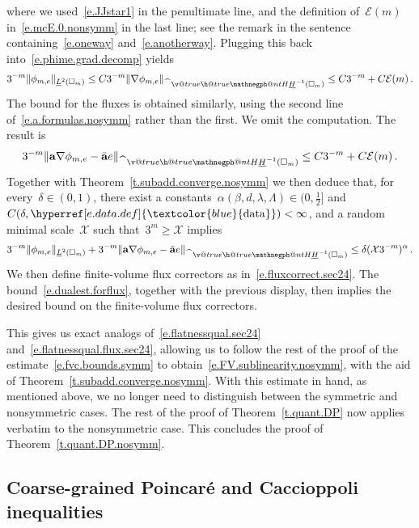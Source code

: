 \documentclass[11pt,twoside]{article} %
\makeatletter
\let\oldsquare\square %
\renewcommand{\square}{\oldsquare}
\numberwithin{equation}{section}
\theoremstyle{definition}
\newcommand{\dataref}{\hyperref[e.data.def]{\textcolor{blue}{\ensuremath{\mathrm{data}}}}}
\renewcommand*{\hat}{\widehat}
\renewcommand{\a}{\mathbf{a}}
\newcommand{\ahom}{\bar{\a}}
\newcommand{\cu}{\square}
\newcommand{\X}{\mathcal{X}}
\newcommand{\negphantom}{\v@true\h@true\negph@nt}
\newcommand{\negph@nt}{\ifmmode\expandafter\mathpalette 
  \expandafter\mathnegph@nt\else\expandafter\makenegph@nt\fi}
\newcommand{\makenegph@nt}[1]{%
  \setbox\z@\hbox{\color@begingroup#1\color@endgroup}\finnegph@nt}
\newcommand{\finnegph@nt}{%
  \setbox\tw@\null 
  \ifv@ \ht\tw@\ht\z@\dp\tw@\dp\z@\fi \ifh@\wd\tw@-\wd\z@\fi\box\tw@}
\newcommand{\mathnegph@nt}[2]{%
  \setbox\z@\hbox{$\m@th #1{#2}$}\finnegph@nt}
\newcommand{\Hminusul}{\hat{\phantom{H}}\negphantom{H}\underline{H}^{-1}}
\makeatother
\begin{document}
where we used~\eqref{e.JJstar1} in the penultimate line, and the definition of~$\mathcal{E}(m)$ in~\eqref{e.mcE.0.nonsymm} in the last line; see the remark in the sentence containing~\eqref{e.oneway} and~\eqref{e.anotherway}. 
Plugging this back into~\eqref{e.phime.grad.decomp} yields
\begin{equation}
\label{e.FCV.nonsymm.grad}
3^{-m} \| \phi_{m,e} \|_{\underline{L}^2(\cu_m)} 
\leq C 
3^{-m} \| \nabla \phi_{m,e} \|_{\Hminusul(\cu_m)} 
\leq
C3^{-m} 
+ 
C\mathcal{E}(m)
\,.
\end{equation}
The bound for the fluxes is obtained similarly, using the second line of~\eqref{e.a.formulas.nosymm} rather than the first. We omit the computation. 
The result is
\begin{equation}
\label{e.FCV.nonsymm.flux}
3^{-m} \| \a \nabla\phi_{m,e} - \ahom e \|_{\Hminusul(\cu_m)} 
\leq
C3^{-m} 
+ 
C\mathcal{E}(m)
\,.
\end{equation}
Together with Theorem~\ref{t.subadd.converge.nosymm} we then deduce that, for every~$\delta \in (0,1)$, there exist a constants~$\alpha(\beta,d,\lambda,\Lambda) \in (0,\tfrac12]$ and~$C(\delta,\dataref)<\infty$, and a random minimal scale~$\X$ such that~$3^m \geq \X$ implies 
\begin{equation} 
\label{e.FVC}
3^{-m} \| \phi_{m,e} \|_{\underline{L}^2(\cu_m)} + 3^{-m} \| \a \nabla\phi_{m,e} - \ahom e \|_{\Hminusul(\cu_m)}  
\leq 
\delta ( \X 3^{-m})^{\alpha}
\,.
\end{equation}
We then define finite-volume flux correctors as in~\eqref{e.fluxcorrect.sec24}. The bound~\eqref{e.dualest.forflux}, together with the previous display, then implies the desired bound on the finite-volume flux correctors. 

\smallskip

This gives us exact analogs of~\eqref{e.flatnessqual.sec24} and~\eqref{e.flatnessqual.flux.sec24}, allowing us to follow the rest of the proof of the estimate~\eqref{e.fvc.bounds.symm} to obtain~\eqref{e.FV.sublinearity.nosymm}, with the aid of Theorem~\ref{t.subadd.converge.nosymm}. With this estimate in hand, as mentioned above, we no longer need to distinguish between the symmetric and nonsymmetric cases. The rest of the proof of Theorem~\ref{t.quant.DP} now applies verbatim to the nonsymmetric case.
This concludes the proof of Theorem~\ref{t.quant.DP.nosymm}.



\subsection{Coarse-grained Poincar\'e and Caccioppoli inequalities}
\label{ss.coarse.graining.inequalities}
\end{document}
